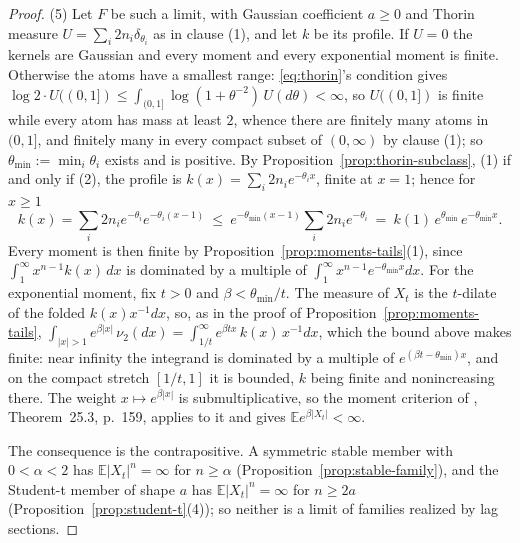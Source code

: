 \begin{proof}
(5) Let $F$ be such a limit, with Gaussian coefficient $a \ge 0$ and Thorin measure
$U = \sum_i 2n_i\delta_{\theta_i}$ as in clause (1), and let $k$ be its profile. If $U = 0$ the
kernels are Gaussian and every moment and every exponential moment is finite. Otherwise the atoms
have a smallest range: \ref{eq:thorin}'s condition gives
$\log 2 \cdot U((0,1]) \le \int_{(0,1]}\log(1+\theta^{-2})\,U(d\theta) < \infty$, so $U((0,1])$ is
finite while every atom has mass at least $2$, whence there are finitely many atoms in $(0,1]$,
and finitely many in every compact subset of $(0,\infty)$ by clause (1); so
$\theta_{\min} := \min_i\theta_i$ exists and is positive. By
Proposition~\ref{prop:thorin-subclass}, (1) if and only if (2), the profile is
$k(x) = \sum_i 2n_ie^{-\theta_ix}$, finite at $x = 1$; hence for $x \ge 1$
\[
  k(x) = \sum_i 2n_ie^{-\theta_i}e^{-\theta_i(x-1)}
   \ \le\ e^{-\theta_{\min}(x-1)}\sum_i 2n_ie^{-\theta_i}
   \ =\ k(1)\,e^{\theta_{\min}}\,e^{-\theta_{\min}x} .
\]
Every moment is then finite by Proposition~\ref{prop:moments-tails}(1), since
$\int_1^\infty x^{n-1}k(x)\,dx$ is dominated by a multiple of
$\int_1^\infty x^{n-1}e^{-\theta_{\min}x}dx$. For the exponential moment, fix $t > 0$ and
$\beta < \theta_{\min}/t$. The \Levy{} measure of $X_t$ is the $t$-dilate of the folded
$k(x)x^{-1}dx$, so, as in the proof of Proposition~\ref{prop:moments-tails},
$\int_{|x|>1}e^{\beta|x|}\,\nu_2(dx) = \int_{1/t}^\infty e^{\beta tx}\,k(x)\,x^{-1}dx$, which the
bound above makes finite: near infinity the integrand is dominated by a multiple of
$e^{(\beta t-\theta_{\min})x}$, and on the compact stretch $[1/t,1]$ it is bounded, $k$ being
finite and nonincreasing there. The weight $x \mapsto e^{\beta|x|}$ is submultiplicative, so the
moment criterion of , Theorem~25.3, p.~159, applies to it and gives
$\mathbb{E}e^{\beta|X_t|} < \infty$.

The consequence is the contrapositive. A symmetric stable member with $0 < \alpha < 2$ has
$\mathbb{E}|X_t|^n = \infty$ for $n \ge \alpha$ (Proposition~\ref{prop:stable-family}), and the
Student-t member of shape $a$ has $\mathbb{E}|X_t|^n = \infty$ for $n \ge 2a$
(Proposition~\ref{prop:student-t}(4)); so neither is a limit of families realized by lag sections.
\end{proof}

